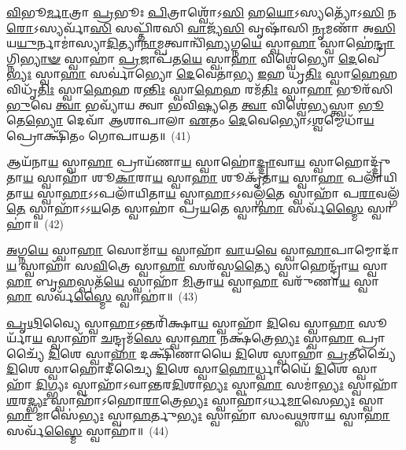 \-\ul{𑌵𑌿}\-𑌭𑍂\-\ul{𑌰𑍍𑌮𑌾}\-𑌤𑍍𑌰𑌾 \ul{𑌪𑍍𑌰}\-𑌭𑍂𑌃 \ul{𑌪𑌿}\-𑌤𑍍𑌰𑌾𑌶𑍍𑌵𑍋᳴\-𑌽\-\ul{𑌸𑌿} 𑌹\-\ul{𑌯𑍋}\-\-𑌽𑌸𑍍𑌯𑌤𑍍𑌯𑍋᳴\-𑌽\-\ul{𑌸𑌿} 𑌨\-\ul{𑌰𑍋}\-\-𑌽𑌸𑍍𑌯𑌰𑍍𑌵𑌾᳴\-\ul{𑌸𑌿} 𑌸𑌪𑍍𑌤𑌿᳴𑌰𑌸𑌿 \ul{𑌵𑌾}\-𑌜𑍍𑌯᳴\-\ul{𑌸𑌿} 𑌵𑍃𑌷𑌾᳴𑌸𑌿 \ul{𑌨𑍃}\-𑌮𑌣𑌾᳴ 𑌅\-\ul{𑌸𑌿} 𑌯\-\ul{𑌯𑍁}\-𑌰𑍍𑌨𑌾𑌮𑌾॑𑌸𑍍𑌯𑌾\-\ul{𑌦𑌿}\-𑌤𑍍𑌯𑌾\-\ul{𑌨𑌾}\-𑌮𑍍𑌪𑌤𑍍𑌵𑌾𑌨𑍍𑌵𑌿᳴\-\ul{𑌹𑍍𑌯}\-𑌗𑍍𑌨\-\ul{𑌯𑍇} 𑌸𑍍𑌵𑌾\-\ul{𑌹𑌾} 𑌸𑍍𑌵𑌾𑌹𑍇॑\-\ul{𑌨𑍍𑌦𑍍𑌰𑌾}\-𑌗𑍍𑌨𑌿\-\ul{𑌭𑍍𑌯𑌾}\-\-\ul{𑍟} 𑌸𑍍𑌵𑌾𑌹𑌾॑ \ul{𑌪𑍍𑌰}\-𑌜𑌾𑌪᳴𑌤\-\ul{𑌯𑍇} 𑌸𑍍𑌵𑌾\-\ul{𑌹𑌾} 𑌵𑌿𑌶𑍍𑌵𑍇॑𑌭𑍍𑌯𑍋 \ul{𑌦𑍇}\-𑌵𑍇\-\ul{𑌭𑍍𑌯𑌃} 𑌸𑍍𑌵𑌾\-\ul{𑌹𑌾} 𑌸𑌰𑍍𑌵𑌾॑𑌭𑍍𑌯𑍋 \ul{𑌦𑍇}\-𑌵𑍇𑌤𑌾॑𑌭𑍍𑌯 \ul{𑌇}\-𑌹 𑌧𑍃\-\ul{𑌤𑌿𑌃} 𑌸𑍍𑌵𑌾\-\ul{𑌹𑍇}\-𑌹 𑌵𑌿𑌧𑍃᳴\-\ul{𑌤𑌿𑌃} 𑌸𑍍𑌵𑌾\-\ul{𑌹𑍇}\-𑌹 𑌰\-\ul{𑌨𑍍𑌤𑌿𑌃} 𑌸𑍍𑌵𑌾\-\ul{𑌹𑍇}\-𑌹 𑌰𑌮᳴\-\ul{𑌤𑌿𑌃} 𑌸𑍍𑌵𑌾\-\ul{𑌹𑌾} 𑌭𑍂𑌰᳴𑌸𑌿 \ul{𑌭𑍁}\-𑌵𑍇 \ul{𑌤𑍍𑌵𑌾} 𑌭𑌵𑍍𑌯𑌾᳴𑌯 𑌤𑍍𑌵𑌾 𑌭𑌵𑌿\-\ul{𑌷𑍍𑌯}\-𑌤𑍇 \ul{𑌤𑍍𑌵𑌾} 𑌵𑌿𑌶𑍍𑌵𑍇॑𑌭𑍍𑌯𑌸𑍍𑌤𑍍𑌵𑌾 \ul{𑌭𑍂}\-𑌤𑍇\-\ul{𑌭𑍍𑌯𑍋} 𑌦𑍇𑌵𑌾᳴ 𑌆𑌶𑌾𑌪𑌾𑌲𑌾 \ul{𑌏}\-𑌤𑌂 \ul{𑌦𑍇}\-𑌵𑍇𑌭𑍍𑌯𑍋\-𑌽\-\ul{𑌶𑍍𑌵}\-𑌮𑍍𑌮𑍇𑌧𑌾᳴\-\ul{𑌯} 𑌪𑍍𑌰𑍋𑌕𑍍𑌷𑌿᳴𑌤𑌂 𑌗𑍋𑌪𑌾𑌯𑌤॥~(41)

{\anuvakamend[{𑌰\-\ul{𑌨𑍍𑌤𑌿𑌃} 𑌸𑍍𑌵𑌾\-\ul{𑌹𑌾} 𑌦𑍍𑌵𑌾𑌵𑌿𑍞᳴𑌶𑌤𑌿𑌶𑍍𑌚}]}%

𑌆𑌯᳴𑌨𑌾\-\ul{𑌯} 𑌸𑍍𑌵𑌾\-\ul{𑌹𑌾} 𑌪𑍍𑌰𑌾𑌯᳴𑌣𑌾\-\ul{𑌯} 𑌸𑍍𑌵𑌾𑌹𑍋॑\-\ul{𑌦𑍍𑌦𑍍𑌰𑌾}\-𑌵𑌾\-\ul{𑌯} 𑌸𑍍𑌵𑌾𑌹𑍋𑌦𑍍𑌦𑍍𑌰𑍁᳴𑌤𑌾\-\ul{𑌯} 𑌸𑍍𑌵𑌾𑌹𑌾᳴ 𑌶𑍂\-\ul{𑌕𑌾}\-𑌰𑌾\-\ul{𑌯} 𑌸𑍍𑌵𑌾\-\ul{𑌹𑌾} 𑌶𑍂𑌕𑍃᳴𑌤𑌾\-\ul{𑌯} 𑌸𑍍𑌵𑌾\-\ul{𑌹𑌾} 𑌪𑌲𑌾᳴𑌯𑌿𑌤𑌾\-\ul{𑌯} 𑌸𑍍𑌵𑌾\-\ul{𑌹𑌾}\-\-𑌽\-𑌽𑌪𑌲𑌾᳴𑌯𑌿𑌤𑌾\-\ul{𑌯} 𑌸𑍍𑌵𑌾\-\ul{𑌹𑌾}\-\-𑌽\-𑌽𑌵𑌲𑍍𑌗᳴\-\ul{𑌤𑍇} 𑌸𑍍𑌵𑌾𑌹𑌾᳴ 𑌪\-\ul{𑌰𑌾}\-𑌵𑌲𑍍𑌗᳴\-\ul{𑌤𑍇} 𑌸𑍍𑌵𑌾𑌹𑌾᳴\-𑌽\-𑌽\-\ul{𑌯}\-𑌤𑍇 𑌸𑍍𑌵𑌾𑌹𑌾॑ 𑌪𑍍𑌰\-\ul{𑌯}\-𑌤𑍇 𑌸𑍍𑌵𑌾\-\ul{𑌹𑌾} 𑌸𑌰𑍍𑌵᳴\-\ul{𑌸𑍍𑌮𑍈} 𑌸𑍍𑌵𑌾𑌹𑌾॑॥~(42)

{\anuvakamend[{𑌆𑌯᳴\-\ul{𑌨𑌾}\-𑌯𑍋𑌤𑍍𑌤᳴𑌰\-\ul{𑌮𑌾}\-𑌪𑌲𑌾᳴𑌯𑌿𑌤𑌾\-\ul{𑌯} 𑌷𑌡𑍍𑌵𑌿𑍞᳴𑌶𑌤𑌿𑌃}]}%

\-\ul{𑌅}\-𑌗𑍍𑌨\-\ul{𑌯𑍇} 𑌸𑍍𑌵𑌾\-\ul{𑌹𑌾} 𑌸𑍋𑌮𑌾᳴\-\ul{𑌯} 𑌸𑍍𑌵𑌾𑌹𑌾᳴ \ul{𑌵𑌾}\-𑌯\-\ul{𑌵𑍇} 𑌸𑍍𑌵𑌾\-\ul{𑌹𑌾}\-𑌪𑌾𑌮𑍍𑌮𑍋𑌦𑌾᳴\-\ul{𑌯} 𑌸𑍍𑌵𑌾𑌹𑌾᳴ 𑌸\-\ul{𑌵𑌿}\-𑌤𑍍𑌰𑍇 𑌸𑍍𑌵𑌾\-\ul{𑌹𑌾} 𑌸𑌰᳴𑌸𑍍𑌵\-\ul{𑌤𑍍𑌯𑍈} 𑌸𑍍𑌵𑌾𑌹𑍇𑌨𑍍𑌦𑍍𑌰𑌾᳴\-\ul{𑌯} 𑌸𑍍𑌵𑌾\-\ul{𑌹𑌾} 𑌬𑍃\-\ul{𑌹}\-𑌸𑍍𑌪𑌤᳴\-\ul{𑌯𑍇} 𑌸𑍍𑌵𑌾𑌹𑌾᳴ \ul{𑌮𑌿}\-𑌤𑍍𑌰𑌾\-\ul{𑌯} 𑌸𑍍𑌵𑌾\-\ul{𑌹𑌾} 𑌵𑌰𑍁᳴𑌣𑌾\-\ul{𑌯} 𑌸𑍍𑌵𑌾\-\ul{𑌹𑌾} 𑌸𑌰𑍍𑌵᳴\-\ul{𑌸𑍍𑌮𑍈} 𑌸𑍍𑌵𑌾𑌹𑌾॑॥~(43)

{\anuvakamend[{}]}

\-\ul{𑌪𑍃}\-\-\ul{𑌥𑌿}\-𑌵𑍍𑌯𑍈 𑌸𑍍𑌵𑌾\-\ul{𑌹𑌾}\-\-𑌽𑌨𑍍𑌤𑌰𑌿᳴𑌕𑍍𑌷𑌾\-\ul{𑌯} 𑌸𑍍𑌵𑌾𑌹𑌾᳴ \ul{𑌦𑌿}\-𑌵𑍇 𑌸𑍍𑌵𑌾\-\ul{𑌹𑌾} 𑌸𑍂𑌰𑍍𑌯𑌾᳴\-\ul{𑌯} 𑌸𑍍𑌵𑌾𑌹𑌾᳴ \ul{𑌚}\-𑌨𑍍𑌦𑍍𑌰𑌮᳴\-\ul{𑌸𑍇} 𑌸𑍍𑌵𑌾\-\ul{𑌹𑌾} 𑌨𑌕𑍍𑌷᳴𑌤𑍍𑌰𑍇\-\ul{𑌭𑍍𑌯𑌃} 𑌸𑍍𑌵𑌾\-\ul{𑌹𑌾} 𑌪𑍍𑌰𑌾𑌚𑍍𑌯𑍈᳴ \ul{𑌦𑌿}\-𑌶𑍇 𑌸𑍍𑌵𑌾\-\ul{𑌹𑌾} 𑌦𑌕𑍍𑌷𑌿᳴𑌣𑌾𑌯𑍈 \ul{𑌦𑌿}\-𑌶𑍇 𑌸𑍍𑌵𑌾𑌹𑌾॑ \ul{𑌪𑍍𑌰}\-𑌤𑍀𑌚𑍍𑌯𑍈᳴ \ul{𑌦𑌿}\-𑌶𑍇 𑌸𑍍𑌵𑌾𑌹𑍋𑌦𑍀॑𑌚𑍍𑌯𑍈 \ul{𑌦𑌿}\-𑌶𑍇 𑌸𑍍𑌵𑌾\-\ul{𑌹𑍋}\-𑌰𑍍𑌧𑍍𑌵𑌾𑌯𑍈᳴ \ul{𑌦𑌿}\-𑌶𑍇 𑌸𑍍𑌵𑌾𑌹𑌾᳴ \ul{𑌦𑌿}\-𑌗𑍍𑌭𑍍𑌯𑌃 𑌸𑍍𑌵𑌾𑌹𑌾᳴\-𑌽\-𑌵𑌾𑌨𑍍𑌤𑌰\-\ul{𑌦𑌿}\-𑌶𑌾\-\ul{𑌭𑍍𑌯𑌃} 𑌸𑍍𑌵𑌾\-\ul{𑌹𑌾} 𑌸𑌮𑌾॑\-\ul{𑌭𑍍𑌯𑌃} 𑌸𑍍𑌵𑌾𑌹𑌾᳴ \ul{𑌶}\-𑌰\-\ul{𑌦𑍍𑌭𑍍𑌯𑌃} 𑌸𑍍𑌵𑌾𑌹𑌾᳴\-𑌽𑌹𑍋\-\ul{𑌰𑌾}\-𑌤𑍍𑌰𑍇\-\ul{𑌭𑍍𑌯𑌃} 𑌸𑍍𑌵𑌾𑌹𑌾॑\-𑌽𑌰𑍍𑌧\-\ul{𑌮𑌾}\-𑌸𑍇\-\ul{𑌭𑍍𑌯𑌃} 𑌸𑍍𑌵𑌾\-\ul{𑌹𑌾} 𑌮𑌾𑌸𑍇॑\-\ul{𑌭𑍍𑌯𑌃} 𑌸𑍍𑌵𑌾\-\ul{𑌹}\-𑌰𑍍𑌤𑍁\-\ul{𑌭𑍍𑌯𑌃} 𑌸𑍍𑌵𑌾𑌹𑌾᳴ 𑌸𑌂𑌵\-\ul{𑌥𑍍𑌸}\-𑌰𑌾\-\ul{𑌯} 𑌸𑍍𑌵𑌾\-\ul{𑌹𑌾} 𑌸𑌰𑍍𑌵᳴\-\ul{𑌸𑍍𑌮𑍈} 𑌸𑍍𑌵𑌾𑌹𑌾॑॥~(44)

